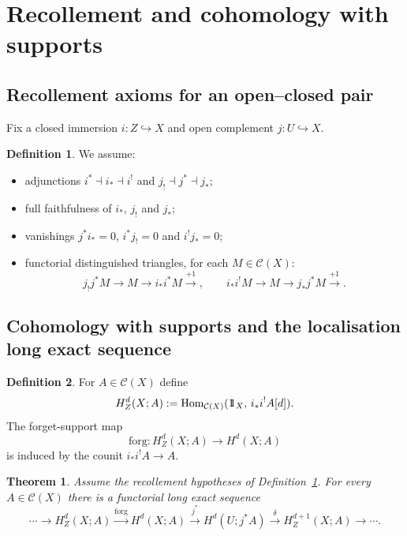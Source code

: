 \documentclass[10pt,a4paper,dvipsnames,x11names]{amsart}
\newcommand{\one}{1\hskip-3.5pt1}
\newcommand{\C}{\mathcal C}
\newcommand{\Hom}{\mathrm{Hom}}
\newcommand{\forg}{\mathrm{forg}}
\numberwithin{equation}{section}
\theoremstyle{plain}
\newtheorem{theorem}{Theorem}[section]
\theoremstyle{definition}
\newtheorem{definition}[definition]{Definition}
\theoremstyle{remark}
\begin{document}
\section{Recollement and cohomology with supports}\label{sec:recollement}

\subsection{Recollement axioms for an open--closed pair}

Fix a closed immersion $i:Z\hookrightarrow X$ and open complement $j:U\hookrightarrow X$.

\begin{definition} \label{def:recollement}
We assume:
\begin{itemize}
\item adjunctions $i^*\dashv i_*\dashv i^!$ and $j_!\dashv j^*\dashv j_*$;
\item full faithfulness of $i_*$, $j_!$ and $j_*$;
\item vanishings $j^*i_*=0$, $i^*j_!=0$ and $i^!j_*=0$;
\item functorial distinguished triangles, for each $M\in\C(X)$:
$$
j_!j^*M \longrightarrow M \longrightarrow i_*i^*M \xrightarrow{+1},
\qquad
i_*i^!M \longrightarrow M \longrightarrow j_*j^*M \xrightarrow{+1}.
$$
\end{itemize}
\end{definition}

\subsection{Cohomology with supports and the localisation long exact sequence}

\begin{definition} \label{def:supports}
For $A\in\C(X)$ define
$$
H_Z^d(X;A):=\Hom_{\C(X)}(\one_X,\, i_*i^!A[d]).
$$
The forget-support map
$$
\forg:H_Z^d(X;A)\to H^d(X;A)
$$
is induced by the counit $i_*i^!A\to A$.
\end{definition}

\begin{theorem} \label{thm:les}
Assume the recollement hypotheses of Definition~\ref{def:recollement}. For every $A\in\C(X)$ there is a functorial long exact sequence
$$
\cdots \longrightarrow H_Z^{d}(X;A)\xrightarrow{\forg} H^{d}(X;A)\xrightarrow{j^{*}}
H^{d}(U;j^{*}A)\xrightarrow{\delta} H_Z^{d+1}(X;A)\longrightarrow \cdots.
$$
\end{theorem}
\end{document}
